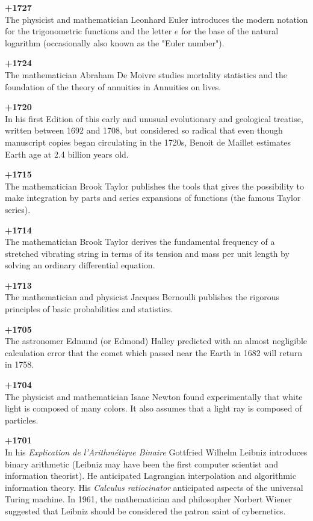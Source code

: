 \textbf{+1727}\\
The physicist and mathematician Leonhard Euler introduces the modern notation for the trigonometric functions and the letter $e$ for the base of the natural logarithm (occasionally also known as the "Euler number").

\textbf{+1724}\\
The mathematician Abraham De Moivre studies mortality statistics and the foundation of the theory of annuities in Annuities on lives.

\textbf{+1720}\\
In his first Edition of this early and unusual evolutionary and geological treatise, written between 1692 and 1708, but considered so radical that even though manuscript copies began circulating in the 1720s, Benoit de Maillet estimates Earth age at 2.4 billion years old.

\textbf{+1715}\\
The mathematician Brook Taylor publishes the tools that gives the possibility to make integration by parts and series expansions of functions (the famous Taylor series).

\textbf{+1714}\\
The mathematician Brook Taylor derives the fundamental frequency of a stretched vibrating string in terms of its tension and mass per unit length by solving an ordinary differential equation.

\textbf{+1713}\\
The mathematician and physicist Jacques Bernoulli publishes the rigorous principles of basic probabilities and statistics.

\textbf{+1705}\\
The astronomer Edmund (or Edmond) Halley predicted with an almost negligible calculation error  that the comet which passed near the Earth in 1682 will return in 1758.

\textbf{+1704}\\
The physicist and mathematician Isaac Newton found experimentally that white light is composed of many colors. It also assumes that a light ray is composed of particles.

\textbf{+1701}\\
In his \textit{Explication de l'Arithmétique Binaire} Gottfried Wilhelm Leibniz introduces binary arithmetic (Leibniz may have been the first computer scientist and information theorist). He anticipated Lagrangian interpolation and algorithmic information theory. His \textit{Calculus ratiocinator} anticipated aspects of the universal Turing machine. In 1961, the mathematician and philosopher Norbert Wiener suggested that Leibniz should be considered the patron saint of cybernetics.

